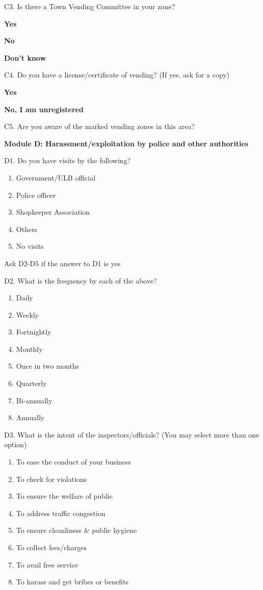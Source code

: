 \documentclass[a4paper, 12pt, twoside]{article}
\begin{document}
{{\begin{mdframed}[backgroundcolor=gray!20]
C3. Is there a Town Vending Committee in your zone?

\textbf{Yes}

\textbf{No}

\textbf{Don’t know}

C4. Do you have a license/certificate of vending? (If yes, ask for a copy)

\textbf{Yes}

\textbf{No, I am unregistered}

C5. Are you aware of the marked vending zones in this area?

\textbf{Module D: Harassment/exploitation by police and other authorities}

D1. Do you have visits by the following?
\begin{enumerate}
\item Government/ULB official
\item Police officer
\item Shopkeeper Association
\item Others
\item No visits
\end{enumerate}

Ask D2-D5 if the answer to D1 is yes

D2. What is the frequency by each of the above?
\begin{enumerate}
\item Daily
\item Weekly
\item Fortnightly
\item Monthly
\item Once in two months
\item Quarterly
\item Bi-annually
\item Annually
\end{enumerate}

D3. What is the intent of the inspectors/officials? (You may select more than one option)
\begin{enumerate}
\item To ease the conduct of your business
\item To check for violations
\item To ensure the welfare of public
\item To address traffic congestion
\item To ensure cleanliness \& public hygiene
\item To collect fees/charges
\item To avail free service
\item To harass and get bribes or benefits
\end{enumerate}


\end{mdframed}}}
\end{document}

